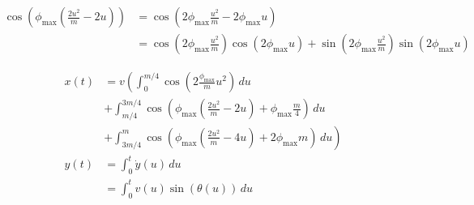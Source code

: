 \documentclass{article}
\begin{document}
\begin{align}
  \cos\left(\phi_{\max}\left(\frac{2u^{2}}{m}-2u\right)\right) &= \cos\left(2\phi_{\max}\frac{u^{2}}{m}-2\phi_{\max}u\right)\\
  &= \cos\left(2\phi_{\max}\frac{u^{2}}{m}\right)\cos\left(2\phi_{\max}u\right) + \sin\left(2\phi_{\max}\frac{u^{2}}{m}\right)\sin\left(2\phi_{\max}u\right)
\end{align}


\begin{align}
  x\left(t\right) &= v \left(\int_{0}^{m/4} \cos\left(2\frac{\phi_{\max}}{m} u^2\right)\,du\right.\\
  &+ \int_{m/4}^{3m/4} \cos\left(\phi_{\max}\left(\frac{2u^{2}}{m}-2u\right) + \phi_{\max}\frac{m}{4}\right)\,du\\
  &+ \left.\int_{3m/4}^{m} \cos\left(\phi_{\max}\left(\frac{2u^{2}}{m}-4u\right) + 2\phi_{\max}m\right)\,du\right)\\
  y\left(t\right) &= \int_{0}^{t} \dot{y}\left(u\right)\,du\\
  &= \int_{0}^{t} v\left(u\right)\sin\left(\theta\left(u\right)\right)\,du
\end{align}
\end{document}
